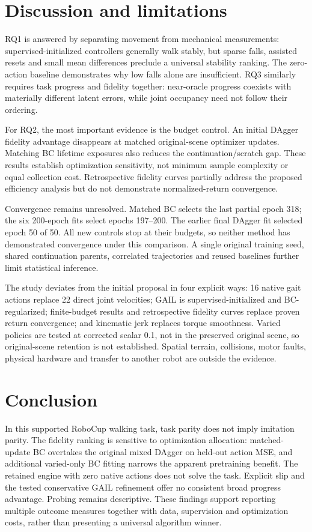 \documentclass[conference]{IEEEtran}
\begin{document}
\section{Discussion and limitations}

RQ1 is answered by separating movement from mechanical measurements: supervised-initialized controllers generally walk stably, but sparse falls, assisted resets and small mean differences preclude a universal stability ranking. The zero-action baseline demonstrates why low falls alone are insufficient. RQ3 similarly requires task progress and fidelity together: near-oracle progress coexists with materially different latent errors, while joint occupancy need not follow their ordering.

For RQ2, the most important evidence is the budget control. An initial DAgger fidelity advantage disappears at matched original-scene optimizer updates. Matching BC lifetime exposures also reduces the continuation/scratch gap. These results establish optimization sensitivity, not minimum sample complexity or equal collection cost. Retrospective fidelity curves partially address the proposed efficiency analysis but do not demonstrate normalized-return convergence.

Convergence remains unresolved. Matched BC selects the last partial epoch 318; the six 200-epoch fits select epochs 197--200. The earlier final DAgger fit selected epoch 50 of 50. All new controls stop at their budgets, so neither method has demonstrated convergence under this comparison. A single original training seed, shared continuation parents, correlated trajectories and reused baselines further limit statistical inference.

The study deviates from the initial proposal in four explicit ways: 16 native gait actions replace 22 direct joint velocities; GAIL is supervised-initialized and BC-regularized; finite-budget results and retrospective fidelity curves replace proven return convergence; and kinematic jerk replaces torque smoothness. Varied policies are tested at corrected scalar 0.1, not in the preserved original scene, so original-scene retention is not established. Spatial terrain, collisions, motor faults, physical hardware and transfer to another robot are outside the evidence.

\section{Conclusion}

In this supported RoboCup walking task, task parity does not imply imitation parity. The fidelity ranking is sensitive to optimization allocation: matched-update BC overtakes the original mixed DAgger on held-out action MSE, and additional varied-only BC fitting narrows the apparent pretraining benefit. The retained engine with zero native actions does not solve the task. Explicit slip and the tested conservative GAIL refinement offer no consistent broad progress advantage. Probing remains descriptive. These findings support reporting multiple outcome measures together with data, supervision and optimization costs, rather than presenting a universal algorithm winner.
\end{document}
